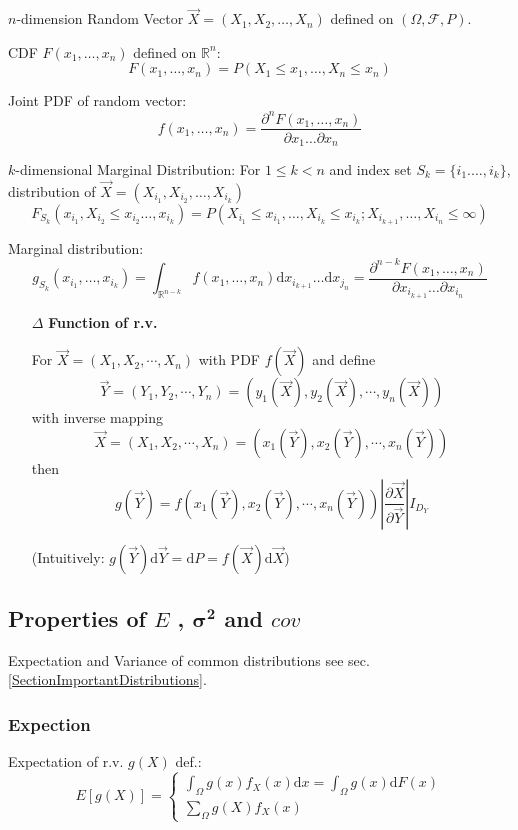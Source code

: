     $n$-dimension Random Vector $\vec{X}=(X_1,X_2,\ldots,X_n)$ defined on $(\Omega,\mathscr{F},P)$.

    CDF $F(x_1,\ldots,x_n)$ defined on $\mathbb{R}^n$:
    \[F(x_1,\ldots,x_n)=P(X_1\leq x_1,\ldots,X_n\leq x_n)\]

    Joint PDF of random vector: 
    \[
        f(x_1,\ldots,x_n)=\dfrac{\partial^n F(x_1,\ldots,x_n)}{\partial x_1\ldots\partial x_n}
    \]

    $k$-dimensional Marginal Distribution: For $1\leq k<n$ and index set $S_k=\{i_1.\ldots,i_k\}$, distribution of $\vec{X}=(X_{i_1},X_{i_2},\ldots,X_{i_k})$
    \[F_{S_k}(x_{i_1},X_{i_2}\leq x_{i_2}\ldots,x_{i_k})=P(X_{i_1}\leq x_{i_1},\ldots,X_{i_k}\leq x_{i_k};X_{i_{k+1}},\ldots,X_{i_n}\leq\infty)\]

    Marginal distribution: 
    \[
        g_{S_k}(x_{i_1},\ldots,x_{i_k})=\int_{\mathbb{R}^{n-k}}f(x_1,\ldots,x_n)\mathrm{d}x_{i_{k+1}}\ldots\mathrm{d}x_{j_n}=\dfrac{\partial^{n-k}F(x_1,\ldots,x_n)}{\partial x_{i_{k+1}}\ldots\partial x_{i_n}}
    \]


    \begin{itemize}
        \item[$\Delta$] \textbf{Function of r.v.}
        
        For $\vec{X}=(X_1,X_2,\cdots,X_n)$ with PDF $f(\vec{X})$ and define 
        \[
            \vec{Y}=(Y_1,Y_2,\cdots,Y_n)=(y_1(\vec{X}),y_2(\vec{X}),\cdots,y_n(\vec{X}))
        \]
        with inverse mapping
        \[
            \vec{X}=(X_1,X_2,\cdots,X_n)=(x_1(\vec{Y}),x_2(\vec{Y}),\cdots,x_n(\vec{Y}))
        \]
        then
        \[
            g(\vec{Y})= f(x_1(\vec{Y}),x_2(\vec{Y}),\cdots,x_n(\vec{Y}))\left|\frac{\partial \vec{X}}{\partial\vec{Y}}\right|I_{D_Y}
        \]

        (Intuitively: $g(\vec{Y})\mathrm{d}\vec{Y}=\mathrm{d}P=f(\vec{X})\mathrm{d}\vec{X}$)
    \end{itemize}




\subsection{Properties of $E$ , $\mathbf{\sigma^2}$ and $cov$}

    Expectation and Variance of common distributions see sec.\ref{SectionImportantDistributions}.

\subsubsection{Expection}
    Expectation of r.v. $g(X)$ def.:
    \[
    E[g(X)]=\begin{cases}
        {\displaystyle\int_\Omega g(x) f_X(x)\mathrm{d}x=\int_\Omega g(x)\mathrm{d}F(x)}\\
        {\displaystyle\sum_{\Omega}g(X)f_X(x)}
    \end{cases}
\]

